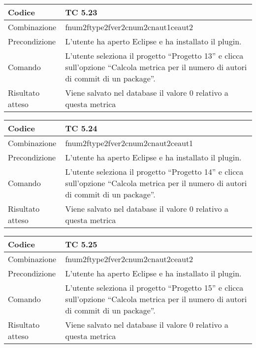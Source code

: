 \begin{table}[ht]
\begin{tabular}{|p{3cm}|p{9cm}|}
\hline
\cellcolor{lightgray}Codice				& TC 5.23								\\
\hline
\cellcolor{lightgray}Combinazione		& fnum2ftype2fver2cnum2cnaut1ceaut2									\\
\hline
\cellcolor{lightgray}Precondizione		& L'utente ha aperto Eclipse e ha installato il plugin.					\\
\hline
\cellcolor{lightgray}Comando			& L'utente seleziona il progetto ``Progetto 13''  e clicca sull'opzione ``Calcola metrica per il numero di autori di commit di un package''.	\\
\hline
\cellcolor{lightgray}Risultato atteso	& Viene salvato nel database il valore 0 relativo a questa metrica	\\
\hline
\end{tabular}
\end{table}

\begin{table}[ht]
\begin{tabular}{|p{3cm}|p{9cm}|}
\hline
\cellcolor{lightgray}Codice				& TC 5.24								\\
\hline
\cellcolor{lightgray}Combinazione		& fnum2ftype2fver2cnum2cnaut2ceaut1								\\
\hline
\cellcolor{lightgray}Precondizione		& L'utente ha aperto Eclipse e ha installato il plugin.			\\
\hline
\cellcolor{lightgray}Comando			& L'utente seleziona il progetto ``Progetto 14''  e clicca sull'opzione ``Calcola metrica per il numero di autori di commit di un package''.	\\
\hline
\cellcolor{lightgray}Risultato atteso	& Viene salvato nel database il valore 0 relativo a questa metrica	\\
\hline
\end{tabular}
\end{table}

\begin{table}[ht]
\begin{tabular}{|p{3cm}|p{9cm}|}
\hline
\cellcolor{lightgray}Codice				& TC 5.25								\\
\hline
\cellcolor{lightgray}Combinazione		& fnum2ftype2fver2cnum2cnaut2ceaut2 									\\
\hline
\cellcolor{lightgray}Precondizione		& L'utente ha aperto Eclipse e ha installato il plugin.			\\
\hline
\cellcolor{lightgray}Comando			& L'utente seleziona il progetto ``Progetto 15''  e clicca sull'opzione ``Calcola metrica per il numero di autori di commit di un package''.	\\
\hline
\cellcolor{lightgray}Risultato atteso	& Viene salvato nel database il valore 0 relativo a questa metrica	\\
\hline
\end{tabular}
\end{table}

